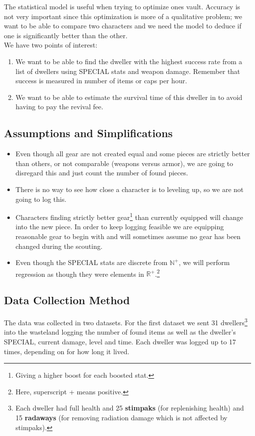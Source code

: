 The statistical model is useful when trying to optimize ones vault. Accuracy is not very important since this optimization is more of a qualitative problem; we want to be able to compare two characters and we need the model to deduce if one is significantly better than the other.\\

We have two points of interest:
\begin{enumerate}
\item We want to be able to find the dweller with the highest success rate from a list of dwellers using SPECIAL stats and weapon damage. Remember that success is measured in number of items or caps per hour.
\item We want to be able to estimate the survival time of this dweller in to avoid having to pay the revival fee.
\end{enumerate}

\subsection{Assumptions and Simplifications}
\begin{itemize}
\item Even though all gear are not created equal and some pieces are strictly better than others, or not comparable (weapons versus armor), we are going to disregard this and just count the number of found pieces.
\item There is no way to see how close a character is to leveling up, so we are not going to log this.
\item Characters finding strictly better gear\footnote{Giving a higher boost for each boosted stat.} than currently equipped will change into the new piece. In order to keep logging feasible we are equipping reasonable gear to begin with and will sometimes assume no gear has been changed during the scouting.
\item Even though the SPECIAL stats are discrete from $\mathbb{N}^+$, we will perform regression as though they were elements in $\mathbb{R}^+$.\footnote{Here, superscript + means positive.}
\end{itemize}

\subsection{Data Collection Method}
The data was collected in two datasets. For the first dataset we sent 31 dwellers\footnote{Each dweller had full health and 25 \textbf{stimpaks} (for replenishing health) and 15 \textbf{radaways} (for removing radiation damage which is not affected by stimpaks).} into the wasteland logging the number of found items as well as the dweller's SPECIAL, current damage, level and time. Each dweller was logged up to 17 times, depending on for how long it lived.\\

